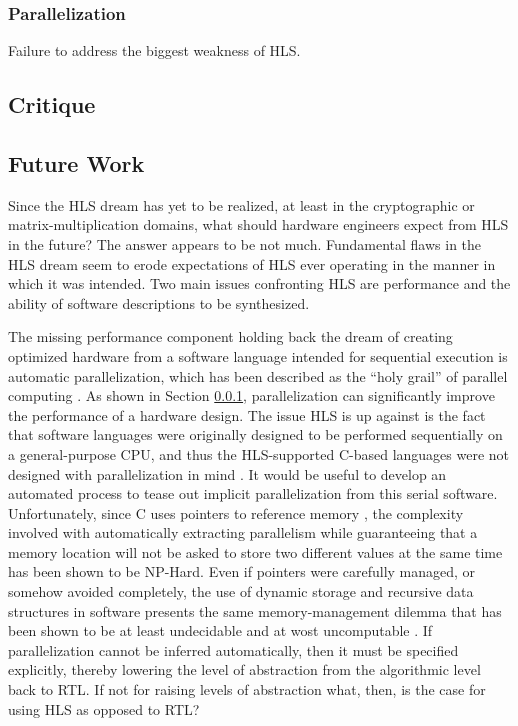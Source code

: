 \documentclass[onecolumn]{article}
\begin{document}
\subsubsection{Parallelization}\label{sec:parallel}
Failure to address the biggest weakness of HLS.

\subsection{Critique}
\subsection{Future Work}\label{sec:future}
Since the HLS dream has yet to be realized, at least in the cryptographic \cite{sel} or matrix-multiplication \cite{skalicky} domains, what should hardware engineers expect from HLS in the future? The answer appears to be not much. Fundamental flaws in the HLS dream seem to erode expectations of HLS ever operating in the manner in which it was intended. Two main issues confronting HLS are performance and the ability of software descriptions to be synthesized. 

The missing performance component holding back the dream of creating optimized hardware from a software language intended for sequential execution is automatic parallelization, which has been described as the ``holy grail'' of parallel computing \cite{holygrail}. As shown in Section \ref{sec:parallel}, parallelization can significantly improve the performance of a hardware design. The issue HLS is up against is the fact that software languages were originally designed to be performed sequentially on a general-purpose CPU, and thus the HLS-supported C-based languages were not designed with parallelization in mind \cite{clanguage}. It would be useful to develop an automated process to tease out implicit parallelization from this serial software. Unfortunately, since C uses pointers to reference memory \cite{cpointers}, the complexity involved with automatically extracting parallelism while guaranteeing that a memory location will not be asked to store two different values at the same time has been shown to be NP-Hard\cite{aliasinghard}. Even if pointers were carefully managed, or somehow avoided completely, the use of dynamic storage and recursive data structures in software presents the same memory-management dilemma that has been shown to be at least undecidable and at wost uncomputable \cite{staticanalysis}. If parallelization cannot be inferred automatically, then it must be specified explicitly, thereby lowering the level of abstraction from the algorithmic level back to RTL. If not for raising levels of abstraction what, then, is the case for using HLS as opposed to RTL?  
\end{document}
